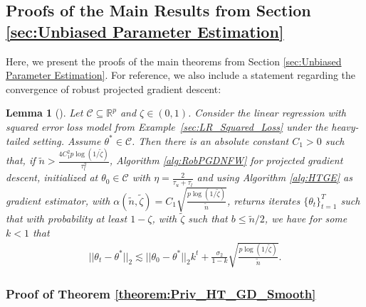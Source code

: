 \documentclass{article}
\newtheorem{lemma}{Lemma}
\begin{document}

\subsection{Proofs of the Main Results from Section \ref{sec:Unbiased Parameter Estimation}}\label{sec:Proofs of the Main Results_Nester}

Here, we present the proofs of the main theorems from Section \ref{sec:Unbiased Parameter Estimation}.
For reference, we also include a statement regarding the convergence of robust projected gradient descent:

\begin{lemma}[\cite{RE}]
\label{lemma:GLMhtGD}
Let $\mathcal{C} \subseteq \mathbb{R}^p$ and $\zeta \in (0, 1)$. Consider the linear regression with squared error loss model from Example~\ref{sec:LR_Squared_Loss} under the heavy-tailed setting. Assume $\theta^* \in \mathcal{C}$. Then there is an absolute constant $C_1 > 0$ such that, if $\widetilde{n} > \frac{4C_1^2p \log(1/\widetilde{\zeta})}{\tau_l^2}$, Algorithm \ref{alg:RobPGDNFW} for projected gradient descent, initialized at $\theta_0 \in \mathcal{C}$ with $\eta = \frac{2}{\tau_u + \tau_l}$ and using Algorithm \ref{alg:HTGE} as gradient estimator, with $\alpha(\widetilde{n}, \widetilde{\zeta}) = C_1\sqrt{\frac{p \log(1/\widetilde{\zeta})}{\widetilde{n}}}$, returns iterates $\{\theta_t\}_{t = 1}^T$ such that with probability at least $1 - \zeta$, with $\widetilde{\zeta}$ such that $b \leq \widetilde{n}/2$, we have for some $k < 1$ that
\begin{align}
\label{eq:GLMhtGD}
||\theta_t - \theta^*||_2 \lesssim ||\theta_0 - \theta^*||_2k^t + \frac{\sigma_2}{1 - k}\sqrt{\frac{p \log (1/\widetilde{\zeta})}{\widetilde{n}}}.
\end{align}
\end{lemma}


\subsubsection{Proof of Theorem \ref{theorem:Priv_HT_GD_Smooth}}
\label{AppThmPriv}
\end{document}
